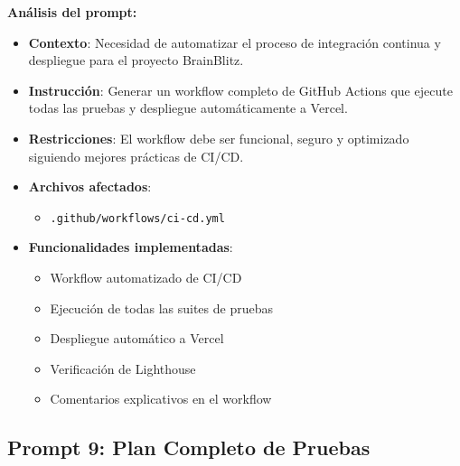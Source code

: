 \documentclass[12pt,a4paper]{article}
\begin{document}
\textbf{Análisis del prompt:}
\begin{itemize}
    \item \textbf{Contexto}: Necesidad de automatizar el proceso de integración continua y despliegue para el proyecto BrainBlitz.
    
    \item \textbf{Instrucción}: Generar un workflow completo de GitHub Actions que ejecute todas las pruebas y despliegue automáticamente a Vercel.
    
    \item \textbf{Restricciones}: El workflow debe ser funcional, seguro y optimizado siguiendo mejores prácticas de CI/CD.
    
    \item \textbf{Archivos afectados}:
    \begin{itemize}
        \item \texttt{.github/workflows/ci-cd.yml}
    \end{itemize}
    
    \item \textbf{Funcionalidades implementadas}:
    \begin{itemize}
        \item Workflow automatizado de CI/CD
        \item Ejecución de todas las suites de pruebas
        \item Despliegue automático a Vercel
        \item Verificación de Lighthouse
        \item Comentarios explicativos en el workflow
    \end{itemize}
\end{itemize}

\subsection{Prompt 9: Plan Completo de Pruebas}
\end{document}
